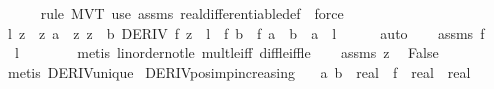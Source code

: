 \begin{isabellebody}
\ \ \ \ \isamarkupfalse%
\ {\isacharparenleft}{\kern0pt}rule\ MVT{\isacharparenright}{\kern0pt}\ {\isacharparenleft}{\kern0pt}use\ assms\ real{\isacharunderscore}{\kern0pt}differentiable{\isacharunderscore}{\kern0pt}def\ \ {\isacartoucheopen}force{\isacharplus}{\kern0pt}{\isacartoucheclose}{\isacharparenright}{\kern0pt}\isanewline
\ \ \isamarkupfalse%
\ \isamarkupfalse%
\ l\ z\ \ z{\isacharcolon}{\kern0pt}\ {\isachardoublequoteopen}a\ {\isacharless}{\kern0pt}\ z{\isachardoublequoteclose}\ {\isachardoublequoteopen}z\ {\isacharless}{\kern0pt}\ b{\isachardoublequoteclose}\ {\isachardoublequoteopen}DERIV\ f\ z\ {\isacharcolon}{\kern0pt}{\isachargreater}{\kern0pt}\ l{\isachardoublequoteclose}\ \ {\isachardoublequoteopen}f\ b\ {\isacharminus}{\kern0pt}\ f\ a\ {\isacharequal}{\kern0pt}\ {\isacharparenleft}{\kern0pt}b\ {\isacharminus}{\kern0pt}\ a{\isacharparenright}{\kern0pt}\ {\isacharasterisk}{\kern0pt}\ l{\isachardoublequoteclose}\isanewline
\ \ \ \ \isamarkupfalse%
\ auto\isanewline
\ \ \isamarkupfalse%
\ assms\ f\ \isamarkupfalse%
\ {\isachardoublequoteopen}{\isasymnot}\ l\ {\isachargreater}{\kern0pt}\ {}{\isachardoublequoteclose}\isanewline
\ \ \ \ \isamarkupfalse%
\ {\isacharparenleft}{\kern0pt}metis\ linorder{\isacharunderscore}{\kern0pt}not{\isacharunderscore}{\kern0pt}le\ mult{\isacharunderscore}{\kern0pt}le{\isacharunderscore}{\kern0pt}{}{\isacharunderscore}{\kern0pt}iff\ diff{\isacharunderscore}{\kern0pt}le{\isacharunderscore}{\kern0pt}{}{\isacharunderscore}{\kern0pt}iff{\isacharunderscore}{\kern0pt}le{\isacharparenright}{\kern0pt}\isanewline
\ \ \isamarkupfalse%
\ assms\ z\ \isamarkupfalse%
\ False\isanewline
\ \ \ \ \isamarkupfalse%
\ {\isacharparenleft}{\kern0pt}metis\ DERIV{\isacharunderscore}{\kern0pt}unique{\isacharparenright}{\kern0pt}\isanewline
{}\isamarkupfalse%
%
\endisatagproof
{\isafoldproof}%
%
\isadelimproof
\isanewline
%
\endisadelimproof
\isanewline
{}\isamarkupfalse%
\ DERIV{\isacharunderscore}{\kern0pt}pos{\isacharunderscore}{\kern0pt}imp{\isacharunderscore}{\kern0pt}increasing{\isacharcolon}{\kern0pt}\isanewline
\ \ \ a\ b\ {\isacharcolon}{\kern0pt}{\isacharcolon}{\kern0pt}\ real\ \ f\ {\isacharcolon}{\kern0pt}{\isacharcolon}{\kern0pt}\ {\isachardoublequoteopen}real\ {\isasymRightarrow}\ real{\isachardoublequoteclose}\isanewline

\end{isabellebody}

